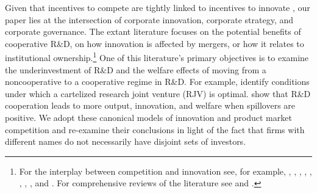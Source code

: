 \documentclass[12pt]{article}
\begin{document}



Given that incentives to compete are tightly linked to incentives to innovate \citep{daspremont1988,hoskisson2002conflicting,aghion2005,bloom2013}, our paper lies at the intersection of corporate innovation, corporate strategy, and corporate governance. The extant literature focuses on the potential benefits of cooperative R\&D, on how innovation is affected by mergers, or how it relates to institutional ownership.\footnote{For the interplay between competition and innovation see, for example, \citet{brander1983}, \citet{spence1984}, \citet{katz1986}, \citet{daspremont1988}, \citet{grossman1991}, \citet{kamien1992}, \citet{suzumura1992}, \citet{aghion1992}, and \citet{leahy1997}. For comprehensive reviews of the literature see \citet{jones2005} and \citet{gilbert2006}.} One of this literature's primary objectives is to examine the underinvestment of R\&D and the welfare effects of moving from a noncooperative to a cooperative regime in R\&D. For example, \cite{kamien1992} identify conditions under which a cartelized research joint venture (RJV) is optimal. \cite{leahy1997} show that R\&D cooperation leads to more output, innovation, and welfare when spillovers are positive. We adopt these canonical models of innovation and product market competition and re-examine their conclusions in light of the fact that firms with different names do not necessarily have disjoint sets of investors.
\end{document}
